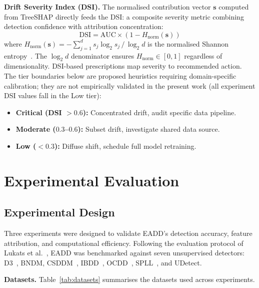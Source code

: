\documentclass[conference,a4paper]{IEEEtran}
\begin{document}
\textbf{Drift Severity Index (DSI).} The normalised contribution vector $\mathbf{s}$ computed from TreeSHAP directly feeds the DSI: a composite severity metric combining detection confidence with attribution concentration:
\begin{equation}
\text{DSI} = \text{AUC} \times \left(1 - H_{\text{norm}}(\mathbf{s})\right)
\label{eq:dsi}
\end{equation}
where $H_{\text{norm}}(\mathbf{s}) = -\sum_{j=1}^{d} s_j \log_2 s_j \,/\, \log_2 d$ is the normalised Shannon entropy~\cite{b34}. The $\log_2 d$ denominator ensures $H_{\text{norm}} \in [0, 1]$ regardless of dimensionality. DSI-based prescriptions map severity to recommended action. The tier boundaries below are proposed heuristics requiring domain-specific calibration; they are not empirically validated in the present work (all experiment DSI values fall in the Low tier):
\begin{itemize}
    \item \textbf{Critical (DSI $> 0.6$):} Concentrated drift, audit specific data pipeline.
    \item \textbf{Moderate ($0.3$--$0.6$):} Subset drift, investigate shared data source.
    \item \textbf{Low ($< 0.3$):} Diffuse shift, schedule full model retraining.
\end{itemize}

\section{Experimental Evaluation}

\subsection{Experimental Design}

Three experiments were designed to validate EADD's detection accuracy, feature attribution, and computational efficiency. Following the evaluation protocol of Lukats et al.~\cite{b10}, EADD was benchmarked against seven unsupervised detectors: D3~\cite{b9}, BNDM, CSDDM~\cite{b15}, IBDD~\cite{b16}, OCDD~\cite{b17}, SPLL~\cite{b18}, and UDetect.

\textbf{Datasets.} Table~\ref{tab:datasets} summarises the datasets used across experiments.
\end{document}
